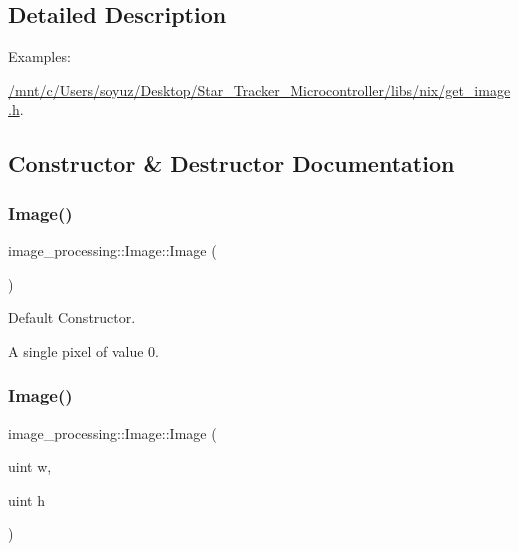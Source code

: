 \subsection{Detailed Description}
\begin{Desc}
\item[Examples\+: ]\par
\hyperlink{_2mnt_2c_2Users_2soyuz_2Desktop_2Star_Tracker_Microcontroller_2libs_2nix_2get_image_8h-example}{/mnt/c/\+Users/soyuz/\+Desktop/\+Star\+\_\+\+Tracker\+\_\+\+Microcontroller/libs/nix/get\+\_\+image.\+h}.\end{Desc}


\subsection{Constructor \& Destructor Documentation}
\mbox{\label{classimage__processing_1_1Image_abba75f0b2369c4776a5585b5106b5230}} 
\subsubsection{\texorpdfstring{Image()}{Image()}\hspace{0.1cm}{\footnotesize\ttfamily [1/3]}}
{\footnotesize\ttfamily image\+\_\+processing\+::\+Image\+::\+Image (\begin{DoxyParamCaption}{ }\end{DoxyParamCaption})}



Default Constructor. 

A single pixel of value 0. \mbox{\label{classimage__processing_1_1Image_af6d00bc8eea560982e2ea61c79a98882}} 
\subsubsection{\texorpdfstring{Image()}{Image()}\hspace{0.1cm}{\footnotesize\ttfamily [2/3]}}
{\footnotesize\ttfamily image\+\_\+processing\+::\+Image\+::\+Image (\begin{DoxyParamCaption}\item[{uint}]{w,  }\item[{uint}]{h }\end{DoxyParamCaption})}



